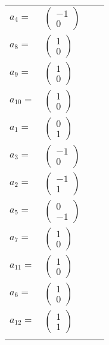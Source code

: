 \documentclass[1p]{elsarticle_modified}
\theoremstyle{definition}
\begin{document}
\begin{tabular}{m{7pt} m{180pt} m{7pt} m{180pt} }
\flushright $a_{4}=$&$\begin{pmatrix}-1\\0\end{pmatrix}$ \\
\flushright $a_{8}=$&$\begin{pmatrix}1\\0\end{pmatrix}$ \\
\flushright $a_{9}=$&$\begin{pmatrix}1\\0\end{pmatrix}$ \\
\flushright $a_{10}=$&$\begin{pmatrix}1\\0\end{pmatrix}$ \\
\flushright $a_{1}=$&$\begin{pmatrix}0\\1\end{pmatrix}$ \\
\flushright $a_{3}=$&$\begin{pmatrix}-1\\0\end{pmatrix}$ \\
\flushright $a_{2}=$&$\begin{pmatrix}-1\\1\end{pmatrix}$ \\
\flushright $a_{5}=$&$\begin{pmatrix}0\\-1\end{pmatrix}$ \\
\flushright $a_{7}=$&$\begin{pmatrix}1\\0\end{pmatrix}$ \\
\flushright $a_{11}=$&$\begin{pmatrix}1\\0\end{pmatrix}$ \\
\flushright $a_{6}=$&$\begin{pmatrix}1\\0\end{pmatrix}$ \\
\flushright $a_{12}=$&$\begin{pmatrix}1\\1\end{pmatrix}$\\&\end{tabular}
\end{document}
